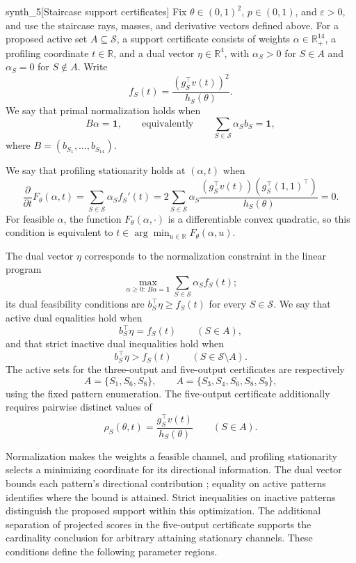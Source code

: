 \begin{definitionv}{synth_5}[Staircase support certificates]
Fix \(\theta\in(0,1)^2\), \(p\in(0,1)\), and \(\varepsilon>0\), and use the staircase rays, masses, and derivative vectors defined above. For a proposed active set \(A\subseteq\mathcal S\), a support certificate consists of weights \(\alpha\in\mathbb R_+^{14}\), a profiling coordinate \(t\in\mathbb R\), and a dual vector \(\eta\in\mathbb R^4\), with \(\alpha_S>0\) for \(S\in A\) and \(\alpha_S=0\) for \(S\notin A\). Write
\[
f_S(t)=\frac{(g_S^\top v(t))^2}{h_S(\theta)}.
\]
We say that primal normalization holds when
\[
B\alpha=\mathbf1,
\qquad\text{equivalently}\qquad
\sum_{S\in\mathcal S}\alpha_S b_S=\mathbf1,
\]
where \(B=(b_{S_1},\ldots,b_{S_{14}})\).

We say that profiling stationarity holds at \((\alpha,t)\) when
\[
\frac{\partial}{\partial t}F_\theta(\alpha,t)
=\sum_{S\in\mathcal S}\alpha_S f_S'(t)
=2\sum_{S\in\mathcal S}\alpha_S
\frac{(g_S^\top v(t))(g_S^\top(1,1)^\top)}{h_S(\theta)}
=0.
\]
For feasible \(\alpha\), the function \(F_\theta(\alpha,\cdot)\) is a differentiable convex quadratic, so this condition is equivalent to \(t\in\arg\min_{u\in\mathbb R}F_\theta(\alpha,u)\).

The dual vector \(\eta\) corresponds to the normalization constraint in the linear program
\[
\max_{\alpha\ge0:\,B\alpha=\mathbf1}
\sum_{S\in\mathcal S}\alpha_S f_S(t);
\]
its dual feasibility conditions are \(b_S^\top\eta\ge f_S(t)\) for every \(S\in\mathcal S\). We say that active dual equalities hold when
\[
b_S^\top\eta=f_S(t)\qquad(S\in A),
\]
and that strict inactive dual inequalities hold when
\[
b_S^\top\eta>f_S(t)\qquad(S\in\mathcal S\setminus A).
\]
The active sets for the three-output and five-output certificates are respectively
\[
A=\{S_1,S_6,S_8\},
\qquad
A=\{S_3,S_4,S_6,S_8,S_9\},
\]
using the fixed pattern enumeration. The five-output certificate additionally requires pairwise distinct values of
\[
\rho_S(\theta,t)=\frac{g_S^\top v(t)}{h_S(\theta)}
\qquad(S\in A).
\]
\end{definitionv}

Normalization makes the weights a feasible channel, and profiling stationarity selects a minimizing coordinate for its directional information. The dual vector  bounds each pattern's directional contribution ; equality on active patterns identifies where the bound is attained. Strict inequalities on inactive patterns distinguish the proposed support within this optimization. The additional separation of projected scores in the five-output certificate supports the cardinality conclusion for arbitrary attaining stationary channels. These conditions define the following parameter regions.

